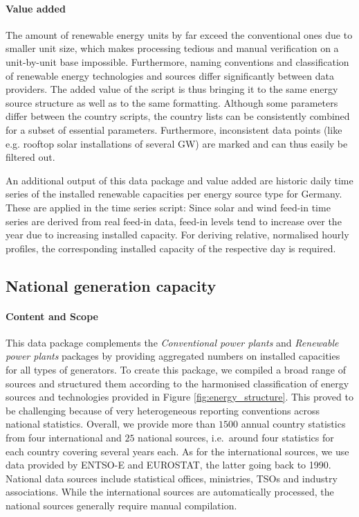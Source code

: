 \documentclass[article,sort&compress]{elsarticle}
\begin{document}
\paragraph{Value added}
The amount of renewable energy units by far exceed the conventional ones due to smaller unit size, which makes processing tedious and manual verification on a unit-by-unit base impossible. Furthermore, naming conventions and classification of renewable energy technologies and sources differ significantly between data providers. The added value of the script is thus bringing it to the same energy source structure as well as to the same formatting. Although some parameters differ between the country scripts, the country lists can be consistently combined for a subset of essential parameters. Furthermore, inconsistent data points (like e.g. rooftop solar installations of several GW) are marked and can thus easily be filtered out.

An additional output of this data package and value added are historic daily time series of the installed renewable capacities per energy source type for Germany. These are applied in the time series script: Since solar and wind feed-in time series are derived from real feed-in data, feed-in levels tend to increase over the year due to increasing installed capacity. For deriving relative, normalised hourly profiles, the corresponding installed capacity of the respective day is required.


\subsection{National generation capacity}
\label{subsec:national generation capacity}
\paragraph{Content and Scope}
This data package complements the \textit{Conventional power plants} and \textit{Renewable power plants} packages by providing aggregated numbers on installed capacities for all types of generators. To create this package, we compiled a broad range of sources and structured them according to the harmonised classification of energy sources and technologies provided in Figure \ref{fig:energy_structure}. This proved to be challenging because of very heterogeneous reporting conventions across national statistics. Overall, we provide more than $1500$ annual country statistics from four international and $25$ national sources, i.e.~around four statistics for each country covering several years each. As for the international sources, we use data provided by ENTSO-E and EUROSTAT, the latter going back to 1990. National data sources include statistical offices, ministries, TSOs and industry associations. While the international sources are automatically processed, the national sources generally require manual compilation.
\end{document}
